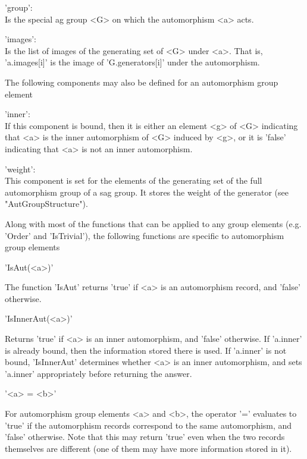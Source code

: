 'group': \\ Is the special ag group <G> on which the automorphism <a> acts.

'images': \\ Is the list of images of the generating set of <G> under <a>.
That is, 'a.images[i]' is the image of 'G.generators[i]' under the automorphism.

\bigskip

The following components may also be defined for an automorphism group element\:


'inner': \\ If this component is bound, then it is either an element <g> of
<G> indicating that <a> is the inner automorphism of <G> induced by <g>, or it is
'false' indicating that <a> is not an inner automorphism.

'weight': \\ This component is set for the elements of the generating set
of the full automorphism group of a sag group. It stores the weight of the
generator (see "AutGroupStructure").


\bigskip

Along with most of the functions that can be applied to any group elements
(e.g. 'Order' and 'IsTrivial'), the following functions are specific to
automorphism group elements\:


\bigskip

'IsAut(<a>)'

The function 'IsAut' returns 'true' if <a> is an automorphism record, and
'false' otherwise.

\bigskip

'IsInnerAut(<a>)'

Returns 'true' if <a> is an inner automorphism, and 'false' otherwise. If
'a.inner' is already bound, then the information stored there is used.  If
'a.inner' is not bound, 'IsInnerAut' determines whether <a> is an inner
automorphism, and sets 'a.inner' appropriately before returning the answer.





'<a> = <b>'

For  automorphism group  elements <a>  and <b>,  the operator '=' evaluates to
'true'  if the automorphism  records correspond to  the same automorphism, and
'false'  otherwise. Note that this may return 'true' even when the two records
themselves are different (one of them may have more information stored in it).


